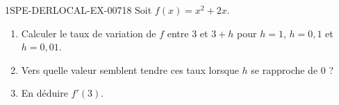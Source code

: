 \begin{exercice}{1SPE-DERLOCAL-EX-007}{1}{8}
Soit $f(x)=x^2+2x$.
\begin{enumerate}
  \item Calculer le taux de variation de $f$ entre $3$ et $3+h$ pour $h=1$, $h=0{,}1$ et $h=0{,}01$.
  \item Vers quelle valeur semblent tendre ces taux lorsque $h$ se rapproche de $0$ ?
  \item En déduire $f'(3)$.
\end{enumerate}
\end{exercice}

